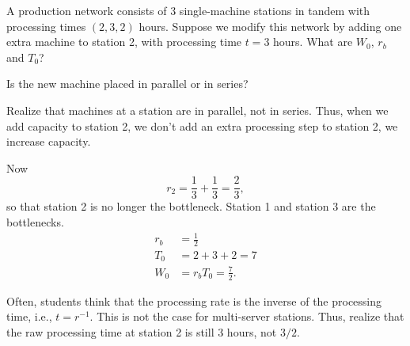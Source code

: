 \begin{exercise}
  A production network consists of 3 single-machine stations in tandem
  with processing times $(2, 3, 2)$ hours.  Suppose we modify this
  network by adding one extra machine to station 2, with processing
  time $t=3$ hours.  What are $W_0$, $r_b$ and $T_0$?
  \begin{hint}
Is the new machine placed in parallel or in series?
  \end{hint}
  \begin{solution}
    Realize that machines at a station are in parallel, not in
    series. Thus, when we add capacity to station 2, we don't add an
    extra processing step to station 2, we increase capacity. 

    Now 
    \begin{equation*}
      r_2 = \frac13 + \frac13 = \frac 23,
    \end{equation*}
    so that station 2 is no longer the bottleneck. Station 1 and
    station 3 are the bottlenecks.
    \begin{align*}
      r_b &= \frac12 \\
      T_0 &= 2 + 3 + 2 = 7\\
      W_0 &= r_b T_0 = \frac72.
    \end{align*}

    Often, students think that the processing rate is the inverse of
    the processing time, i.e., $t=r^{-1}$. This is not the case for
    multi-server stations. Thus, realize that the raw processing time
    at station 2 is still $3$ hours, not $3/2$.
  \end{solution}
\end{exercise}


